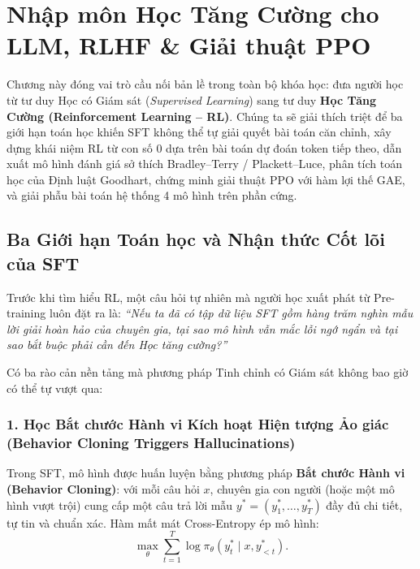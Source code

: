 ﻿\chapter{Nhập môn Học Tăng Cường cho LLM, RLHF \& Giải thuật PPO}
\label{chap:rlhf_ppo}

\begin{pedagogy}
Chương này đóng vai trò cầu nối bản lề trong toàn bộ khóa học: đưa người học từ tư duy Học có Giám sát (\textit{Supervised Learning}) sang tư duy \textbf{Học Tăng Cường (Reinforcement Learning -- RL)}. Chúng ta sẽ giải thích triệt để ba giới hạn toán học khiến SFT không thể tự giải quyết bài toán căn chỉnh, xây dựng khái niệm RL từ con số 0 dựa trên bài toán dự đoán token tiếp theo, dẫn xuất mô hình đánh giá sở thích Bradley--Terry / Plackett--Luce, phân tích toán học của Định luật Goodhart, chứng minh giải thuật PPO với hàm lợi thế GAE, và giải phẫu bài toán hệ thống 4 mô hình trên phần cứng.
\end{pedagogy}

\section{Ba Giới hạn Toán học và Nhận thức Cốt lõi của SFT}
\label{sec:sft_limitations}

Trước khi tìm hiểu RL, một câu hỏi tự nhiên mà người học xuất phát từ Pre-training luôn đặt ra là: \textit{``Nếu ta đã có tập dữ liệu SFT gồm hàng trăm nghìn mẫu lời giải hoàn hảo của chuyên gia, tại sao mô hình vẫn mắc lỗi ngớ ngẩn và tại sao bắt buộc phải cần đến Học tăng cường?''}

Có ba rào cản nền tảng mà phương pháp Tinh chỉnh có Giám sát không bao giờ có thể tự vượt qua:

\subsection{1. Học Bắt chước Hành vi Kích hoạt Hiện tượng Ảo giác (Behavior Cloning Triggers Hallucinations)}
Trong SFT, mô hình được huấn luyện bằng phương pháp \textbf{Bắt chước Hành vi (Behavior Cloning)}: với mỗi câu hỏi $x$, chuyên gia con người (hoặc một mô hình vượt trội) cung cấp một câu trả lời mẫu $y^* = (y_1^*, \dots, y_T^*)$ đầy đủ chi tiết, tự tin và chuẩn xác. Hàm mất mát Cross-Entropy ép mô hình:
\begin{equation}
    \max_\theta \sum_{t=1}^{T} \log \pi_\theta(y_t^* \mid x, y_{<t}^*).
\end{equation}

